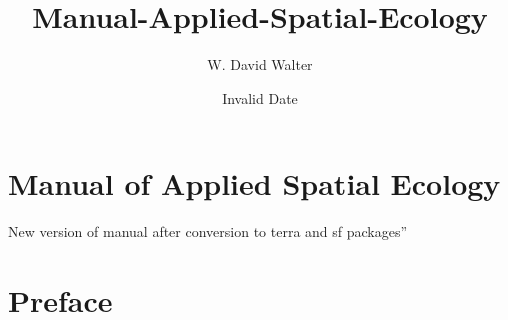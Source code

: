 \documentclass[
  letterpaper,
]{book}
\title{Manual-Applied-Spatial-Ecology}
\author{W. David Walter}
\date{Invalid Date}
\renewcommand*\contentsname{Table of contents}
\newcommand\contentsname{Table of contents}
\begin{document}
\frontmatter
\maketitle
\ifdefined\Shaded\renewenvironment{Shaded}{\begin{tcolorbox}[frame hidden, interior hidden, borderline west={3pt}{0pt}{shadecolor}, enhanced, breakable, boxrule=0pt, sharp corners]}{\end{tcolorbox}}\fi

\renewcommand*\contentsname{Table of contents}
{
\hypersetup{linkcolor=}
\setcounter{tocdepth}{2}
\tableofcontents
}
\mainmatter
{}

\hypertarget{manual-of-applied-spatial-ecology}{%
\chapter{Manual of Applied Spatial
Ecology}\label{manual-of-applied-spatial-ecology}}

\mainmatter

New version of manual after conversion to terra and sf packages''


\hypertarget{preface}{%
\chapter{Preface}\label{preface}}
\end{document}

